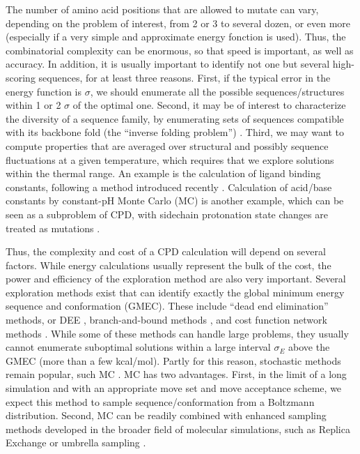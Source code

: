 The number of amino acid positions that are allowed to mutate can vary, depending on the problem of interest, from 2 or 3 to several dozen, or even more (especially if a very simple and approximate energy fonction is used).
Thus, the combinatorial complexity can be enormous, so that speed is important, as well as accuracy.
In addition, it is usually important to identify not one but several high-scoring sequences, for at least three reasons.
First, if the typical error in the energy function is $\sigma$, we should enumerate all the possible sequences/structures within 1 or 2 $\sigma$ of the optimal one.
Second, it may be of interest to characterize the diversity of a sequence family, by enumerating sets of sequences compatible with its backbone fold (the ``inverse folding problem'') \cite{Ponder87,Koehl02,Larson02,Schmidt09,Schmidt10}.
Third, we may want to compute properties that are averaged over structural and possibly sequence fluctuations at a given
temperature, which requires that we explore solutions within the thermal range.
An example is the calculation of ligand binding constants, following a method introduced recently \cite{Druart15}.
Calculation of acid/base constants by constant-pH Monte Carlo (MC) is another example, which can be seen as a subproblem of CPD, with sidechain protonation state changes are treated as mutations \cite{Aleksandrov10b,Polydorides13,Kilambi12}.

Thus, the complexity and cost of a CPD calculation will depend on several factors.
While energy calculations usually represent the bulk of the cost, the power and efficiency of the exploration method are also very important.
Several exploration methods exist that can identify exactly the global minimum energy sequence and conformation (GMEC).
These include ``dead end elimination'' methods, or DEE \cite{Looger01,Georgiev08}, branch-and-bound methods
\cite{Gordon99,Hong09}, and cost function network methods \cite{Traore13,Allouche14}.
While some of these methods can handle large problems, they usually cannot enumerate suboptimal solutions within a large interval $\sigma_E$ above the GMEC (more than a few kcal/mol).
Partly for this reason, stochastic methods remain popular, such MC \cite{Zou03,Samish11}.
MC has two advantages. First, in the limit of a long simulation and with an appropriate move set and move acceptance scheme, we expect this method to sample sequence/conformation from a Boltzmann distribution. Second, MC can be readily combined with enhanced sampling methods developed in the broader field of molecular simulations, such as Replica Exchange or umbrella sampling \cite{FrenkelBK,ChipotBK}. 

